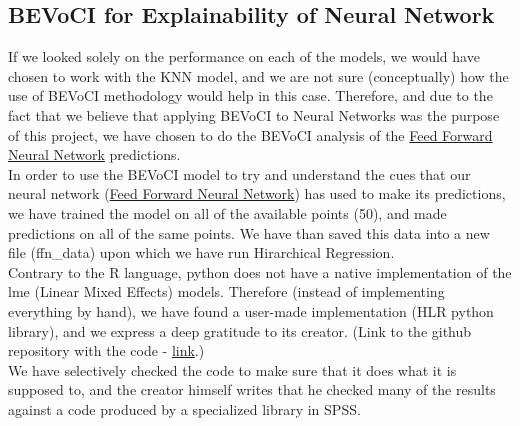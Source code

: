 \documentclass[11pt, oneside]{article}   	%
\begin{document}
\subsection{BEVoCI for Explainability of Neural Network}\label{sec:ffn_hlr}
If we looked solely on the performance on each of the models, we would have chosen to work with the KNN model, and we are not sure (conceptually) how the use of BEVoCI methodology would help in this case. Therefore, and due to the fact that we believe that applying BEVoCI to Neural Networks was the purpose of this project, we have chosen to do the BEVoCI analysis of the \hyperref[sec:ffn]{Feed Forward Neural Network} predictions.\\

In order to use the BEVoCI model to try and understand the cues that our neural network (\hyperref[sec:ffn]{Feed Forward Neural Network}) has used to make its predictions, we have trained the model on all of the available points (50), and made predictions on all of the same points. We have than saved this data into a new file (ffn\_data) upon which we have run Hirarchical Regression.\\

Contrary to the R language, python does not have a native implementation of the lme (Linear Mixed Effects) models.
Therefore (instead of implementing everything by hand), we have found a user-made implementation (HLR python library), and we express a deep gratitude to its creator. (Link to the github repository with the code - \href{https://github.com/teanijarv/HLR}{link}.)\\
We have selectively checked the code to make sure that it does what it is supposed to, and the creator himself writes that he checked many of the results against a code produced by a specialized library in SPSS.
\end{document}
